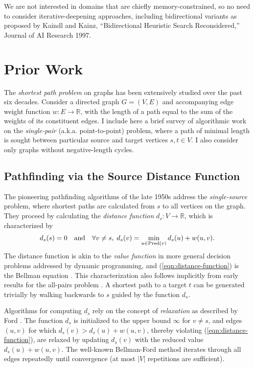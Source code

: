 \documentclass[nobib]{tufte-book}
\begin{document}
We are not interested in domains that are chiefly memory-constrained,
so no need to consider iterative-deepening approaches,
including bidirectional variants as proposed by
Kaindl and Kainz, ``Bidirectional Heuristic Search Reconsidered,''
Journal of AI Research 1997.

\section{Prior Work}

The \emph{shortest path problem} on graphs has been extensively
studied over the past six decades.
Consider a directed graph $G = (V,E)$ and accompanying edge weight
function $w : E \rightarrow \mathbb{R}$,
with the length of a path equal to the sum of the weights of its
constituent edges.
I include here a brief survey of algorithmic work on the
\emph{single-pair} (a.k.a. point-to-point) problem,
where a path of minimal length is sought
between particular source and target vertices
$s,t \in V$.
I also consider only graphs without negative-length cycles.

\subsection{Pathfinding via the Source Distance Function}

The pioneering pathfinding algorithms of the late 1950s address
the \emph{single-source} problem,
where shortest paths are calculated from $s$ to all vertices on
the graph.
They proceed by calculating the \emph{distance function}
$d_s : V \rightarrow \mathbb{R}$,
which is characterized by
\begin{equation}
   d_s(s) = 0
   \quad\mbox{and}\quad
   \forall v \neq s,\;
   d_s(v) = \min_{u \in \mbox{\scriptsize Pred}(v)} d_s(u) + w(u,v).
   \label{eqn:distance-function}
\end{equation}
The distance function is akin to the \emph{value function}
in more general decision problems addressed by dynamic programming,
and (\ref{eqn:distance-function}) is the Bellman equation
\citep{bellman1958routing}.
This characterization also follows implicitly from early results for
the all-pairs problem
\citep{shimbel1955communicationnets, beckmann1955transportation}.
A shortest path to a target $t$ can be generated trivially
by walking backwards to $s$ guided by the function $d_s$.

Algorithms for computing $d_s$ rely on the concept of
\emph{relaxation}
as described by Ford \citep{ford1955networkflowtheory}.
The function $d_s$
is initialized to the upper bound $\infty$ for $v \neq s$,
and edges $(u,v)$ for which $d_s(v) > d_s(u) + w(u,v)$,
thereby violating (\ref{eqn:distance-function}),
are relaxed by updating $d_s(v)$
with the reduced value $d_s(u) + w(u,v)$.
The well-known Bellman-Ford method
\citep{shimbel1955communicationnets, bellman1958routing,
moore1959spmaze}
iterates through all edges repeatedly until convergence
(at most $|V|$ repetitions are sufficient).
\end{document}
